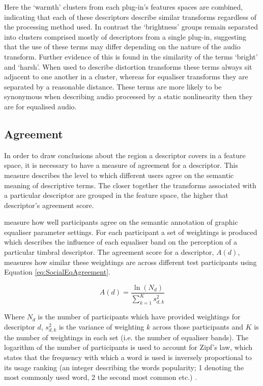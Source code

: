 		Here the `warmth' clusters from each plug-in's features spaces are combined, indicating that each of these
		descriptors describe similar transforms regardless of the processing method used. In contrast the
		`brightness' groups remain separated into clusters comprised mostly of descriptors from a single plug-in,
		suggesting that the use of these terms may differ depending on the nature of the audio transform.  Further
		evidence of this is found in the similarity of the terms `bright' and `harsh'. When used to describe
		distortion transforms these terms always sit adjacent to one another in a cluster, whereas for equaliser
		transforms they are separated by a reasonable distance. These terms are more likely to be synonymous when
		describing audio processed by a static nonlinearity then they are for equalised audio. 

	\subsection{Agreement}
	\label{sec:TimbreEvaluation-Analysis-Agreement}
		In order to draw conclusions about the region a descriptor covers in a feature space, it is necessary to
		have a measure of agreement for a descriptor. This measure describes the level to which different users
		agree on the semantic meaning of descriptive terms. The closer together the transforms associated with a
		particular descriptor are grouped in the feature space, the higher that descriptor's agreement score.

		\citet{cartwright2013socialeq} measure how well participants agree on the semantic annotation of graphic
		equaliser parameter settings. For each participant a set of weightings is produced which describes the
		influence of each equaliser band on the perception of a particular timbral descriptor. The agreement score
		for a descriptor, $A(d)$, measures how similar these weightings are across different test participants
		using Equation \ref{eq:SocialEqAgreement}.

		\begin{equation}
			A(d) = \frac{\ln(N_{d})}{\sum_{k = 1}^{K} s_{d,k}^{2}}
			\label{eq:SocialEqAgreement}
		\end{equation}

		Where $N_{d}$ is the number of participants which have provided weightings for descriptor $d$,
		$s_{d,k}^{2}$ is the variance of weighting $k$ across those participants and $K$ is the number of
		weightings in each set (i.e. the number of equaliser bands). The logarithm of the number of
		participants is used to account for Zipf's law, which states that the frequency with which a word is used
		is inversely proportional to its usage ranking (an integer describing the words popularity; 1 denoting the
		most commonly used word, 2 the second most common etc.) \citep{manning1999foundations}.

